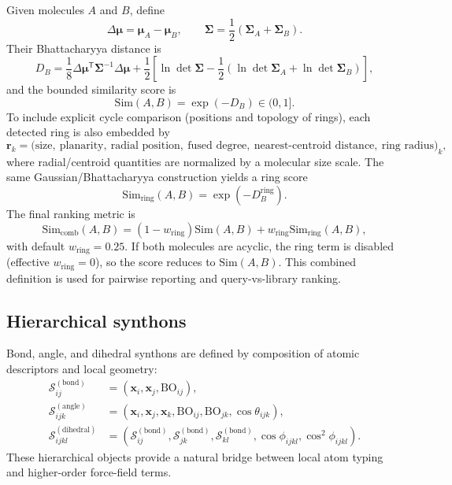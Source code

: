 \documentclass[journal=jctcce,manuscript=article]{achemso}
\begin{document}
Given molecules $A$ and $B$, define
\begin{equation}
\Delta\boldsymbol{\mu}=\boldsymbol{\mu}_A-\boldsymbol{\mu}_B,
\qquad
\mathbf{\Sigma}=\frac{1}{2}\left(\mathbf{\Sigma}_A+\mathbf{\Sigma}_B\right).
\end{equation}
Their Bhattacharyya distance is
\begin{equation}
D_B=
\frac{1}{8}\Delta\boldsymbol{\mu}^\mathsf{T}\mathbf{\Sigma}^{-1}\Delta\boldsymbol{\mu}
+\frac{1}{2}\left[
\ln\det\mathbf{\Sigma}
-\frac{1}{2}\left(\ln\det\mathbf{\Sigma}_A+\ln\det\mathbf{\Sigma}_B\right)
\right],
\end{equation}
and the bounded similarity score is
\begin{equation}
\mathrm{Sim}(A,B)=\exp(-D_B)\in(0,1].
\end{equation}
To include explicit cycle comparison (positions and topology of rings), each detected ring is also embedded by
\begin{equation}
\mathbf{r}_k = \big(
\text{size},\ \text{planarity},\ \text{radial position},\ \text{fused degree},\ \text{nearest-centroid distance},\ \text{ring radius}
\big)_k,
\end{equation}
where radial/centroid quantities are normalized by a molecular size scale.
The same Gaussian/Bhattacharyya construction yields a ring score
\begin{equation}
\mathrm{Sim}_{\mathrm{ring}}(A,B)=\exp\!\left(-D_B^{\mathrm{ring}}\right).
\end{equation}
The final ranking metric is
\begin{equation}
\mathrm{Sim}_{\mathrm{comb}}(A,B)=
\left(1-w_{\mathrm{ring}}\right)\mathrm{Sim}(A,B)+w_{\mathrm{ring}}\mathrm{Sim}_{\mathrm{ring}}(A,B),
\end{equation}
with default $w_{\mathrm{ring}}=0.25$. If both molecules are acyclic, the ring term is disabled (effective $w_{\mathrm{ring}}=0$), so the score reduces to $\mathrm{Sim}(A,B)$.
This combined definition is used for pairwise reporting and query-vs-library ranking.

\subsection{Hierarchical synthons}
Bond, angle, and dihedral synthons are defined by composition of atomic descriptors and local geometry:
\begin{align}
\mathcal{S}^{(\mathrm{bond})}_{ij} &= (\mathbf{x}_i,\mathbf{x}_j,\mathrm{BO}_{ij}),\\
\mathcal{S}^{(\mathrm{angle})}_{ijk} &= (\mathbf{x}_i,\mathbf{x}_j,\mathbf{x}_k,\mathrm{BO}_{ij},\mathrm{BO}_{jk},\cos\theta_{ijk}),\\
\mathcal{S}^{(\mathrm{dihedral})}_{ijkl} &= (\mathcal{S}^{(\mathrm{bond})}_{ij},\mathcal{S}^{(\mathrm{bond})}_{jk},\mathcal{S}^{(\mathrm{bond})}_{kl},\cos\phi_{ijkl},\cos^2\phi_{ijkl}).
\end{align}
These hierarchical objects provide a natural bridge between local atom typing and higher-order force-field terms.
\end{document}

